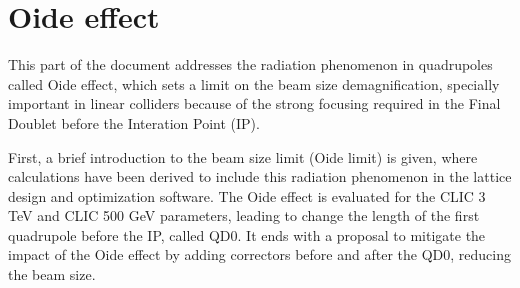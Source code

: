 \chapter{Oide effect}\label{s:Oideeffect}
This part of the document addresses the radiation phenomenon in quadrupoles called Oide effect\cite{Oide}, which sets a limit on the beam size demagnification, specially important in linear colliders because of the strong focusing required in the Final Doublet before the Interation Point (IP).\par
First, a brief introduction to the beam size limit (Oide limit) is given, where calculations have been derived to include this radiation phenomenon in the lattice design and optimization software. The Oide effect is evaluated for the CLIC 3 TeV and CLIC 500 GeV parameters, leading to change the length of the first quadrupole before the IP, called QD0. It ends with a proposal to mitigate the impact of the Oide effect by adding correctors before and after the QD0, reducing the beam size.\par
